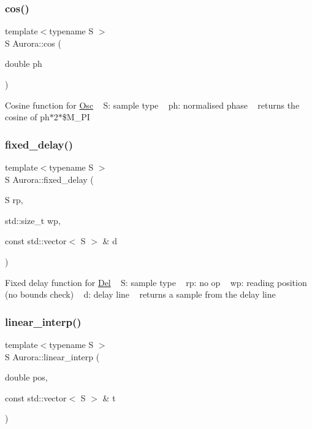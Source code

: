 \subsubsection{\texorpdfstring{cos()}{cos()}}
{\footnotesize\ttfamily template$<$typename S $>$ \\
S Aurora\+::cos (\begin{DoxyParamCaption}\item[{double}]{ph }\end{DoxyParamCaption})}

Cosine function for \hyperlink{class_aurora_1_1_osc}{Osc} ~\newline
S\+: sample type ~\newline
ph\+: normalised phase ~\newline
returns the cosine of ph$\ast$2$\ast$\$\+M\+\_\+\+PI \mbox{\label{namespace_aurora_a62442f237e70fdaac1efc22b4e82e875}} 
\subsubsection{\texorpdfstring{fixed\+\_\+delay()}{fixed\_delay()}}
{\footnotesize\ttfamily template$<$typename S $>$ \\
S Aurora\+::fixed\+\_\+delay (\begin{DoxyParamCaption}\item[{S}]{rp,  }\item[{std\+::size\+\_\+t}]{wp,  }\item[{const std\+::vector$<$ S $>$ \&}]{d }\end{DoxyParamCaption})}

Fixed delay function for \hyperlink{class_aurora_1_1_del}{Del} ~\newline
S\+: sample type ~\newline
rp\+: no op ~\newline
wp\+: reading position (no bounds check) ~\newline
d\+: delay line ~\newline
returns a sample from the delay line \mbox{\label{namespace_aurora_acdc5f35b9cbf54f7fc84a423d76bd488}} 
\subsubsection{\texorpdfstring{linear\+\_\+interp()}{linear\_interp()}}
{\footnotesize\ttfamily template$<$typename S $>$ \\
S Aurora\+::linear\+\_\+interp (\begin{DoxyParamCaption}\item[{double}]{pos,  }\item[{const std\+::vector$<$ S $>$ \&}]{t }\end{DoxyParamCaption})}

